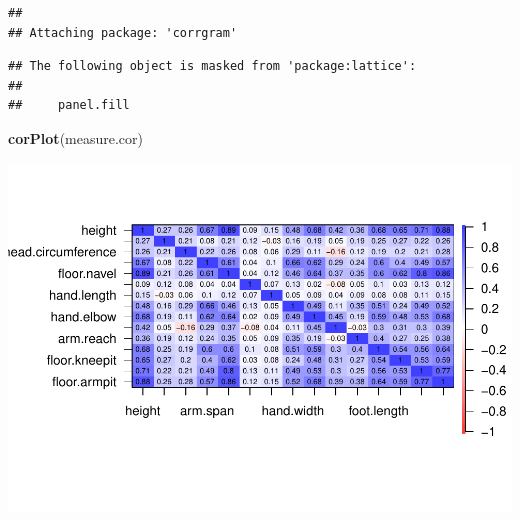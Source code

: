 \documentclass[]{article}
\newenvironment{Shaded}{\begin{snugshade}}{\end{snugshade}}
\newcommand{\KeywordTok}[1]{\textcolor[rgb]{0.13,0.29,0.53}{\textbf{#1}}}
\newcommand{\NormalTok}[1]{#1}
\begin{document}
\begin{verbatim}
## 
## Attaching package: 'corrgram'
\end{verbatim}

\begin{verbatim}
## The following object is masked from 'package:lattice':
## 
##     panel.fill
\end{verbatim}

\begin{Shaded}
\begin{Highlighting}[]
\KeywordTok{corPlot}\NormalTok{(measure.cor)}
\end{Highlighting}
\end{Shaded}

\includegraphics{project-measure_files/figure-latex/correlation-1.pdf}
\end{document}
